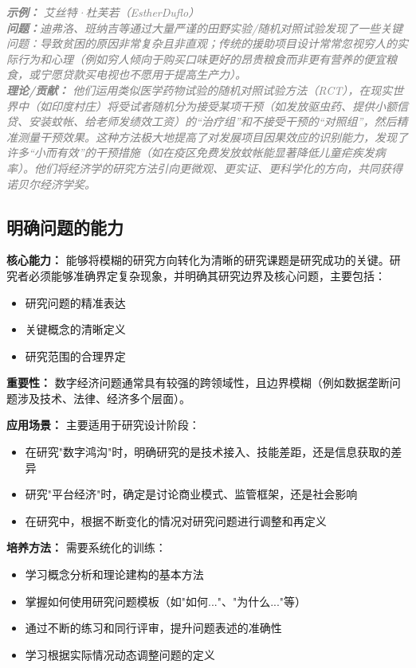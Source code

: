 \documentclass[lang=cn,12pt,a4paper]{elegantpaper}
\newcommand{\skillexample}[1]{\smallskip\noindent\textcolor{gray}{\textit{\footnotesize\textbf{示例：}} \textit{\footnotesize #1}}}
\begin{document}
\skillexample{艾丝特·杜芙若（EstherDuflo）\\
\textbf{问题：}迪弗洛、班纳吉等通过大量严谨的田野实验/随机对照试验发现了一些关键问题：导致贫困的原因非常复杂且非直观；传统的援助项目设计常常忽视穷人的实际行为和心理（例如穷人倾向于购买口味更好的昂贵粮食而非更有营养的便宜粮食，或宁愿贷款买电视也不愿用于提高生产力）。\\
\textbf{理论/贡献：} 他们运用类似医学药物试验的随机对照试验方法（RCT），在现实世界中（如印度村庄）将受试者随机分为接受某项干预（如发放驱虫药、提供小额信贷、安装蚊帐、给老师发绩效工资）的“治疗组”和不接受干预的“对照组”，然后精准测量干预效果。这种方法极大地提高了对发展项目因果效应的识别能力，发现了许多“小而有效”的干预措施（如在疫区免费发放蚊帐能显著降低儿童疟疾发病率）。他们将经济学的研究方法引向更微观、更实证、更科学化的方向，共同获得诺贝尔经济学奖。}

\subsection{明确问题的能力}
{\textbf{核心能力：}} 能够将模糊的研究方向转化为清晰的研究课题是研究成功的关键。研究者必须能够准确界定复杂现象，并明确其研究边界及核心问题，主要包括：
\begin{itemize}
    \item 研究问题的精准表达
    \item 关键概念的清晰定义
    \item 研究范围的合理界定
\end{itemize}

{\textbf{重要性：}} 数字经济问题通常具有较强的跨领域性，且边界模糊（例如数据垄断问题涉及技术、法律、经济多个层面）。

{\textbf{应用场景：}} 主要适用于研究设计阶段：
\begin{itemize}
    \item 在研究"数字鸿沟"时，明确研究的是技术接入、技能差距，还是信息获取的差异
    \item 研究"平台经济"时，确定是讨论商业模式、监管框架，还是社会影响
    \item 在研究中，根据不断变化的情况对研究问题进行调整和再定义
\end{itemize}

{\textbf{培养方法：}} 需要系统化的训练：
\begin{itemize}
    \item 学习概念分析和理论建构的基本方法
    \item 掌握如何使用研究问题模板（如"如何..."、"为什么..."等）
    \item 通过不断的练习和同行评审，提升问题表述的准确性
    \item 学习根据实际情况动态调整问题的定义
\end{itemize}
\end{document}
